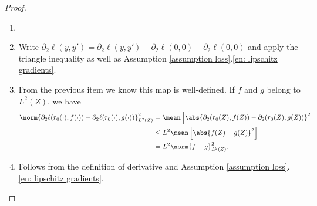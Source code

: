 \begin{proof}
    \begin{enumerate}
        \item[]
        \item Write $ \partial_{ 2 } \ell ( y, y' ) = \partial_{ 2 } \ell ( y, y' ) - \partial_{ 2 } \ell ( 0, 0 ) + \partial_{ 2 } \ell ( 0, 0 ) $ and apply the triangle inequality as well as Assumption \ref{assumption loss}.\ref{en: lipschitz gradients}.
        \item From the previous item we know this map is well-defined.
            If $ f $ and $ g $ belong to $ L^{ 2 } ( Z ) $, we have
            \begin{align*}
                \norm{ \partial_{ 2 } \ell ( r_{ 0 } ( \cdot ), f ( \cdot ) ) - \partial_{ 2 } \ell ( r_{ 0 } ( \cdot ), g ( \cdot ) ) }_{ L^2 ( Z ) }^2
                &= \mean \left[
                    \abs{ 
                        \partial_{ 2 } ( r_{ 0 } ( Z ), f ( Z ) )
                        - \partial_{ 2 } ( r_{ 0 } ( Z ), g ( Z ) )
                    }^2
                \right] \\
                &\leq L^2 \mean \left[
                    \abs{ f ( Z ) - g ( Z ) }^2
                \right] \\
                &= L^2 \norm{ f - g }_{ L^2 ( Z ) }^2
            .\end{align*}
        \item Follows from the definition of derivative and Assumption \ref{assumption loss}.\ref{en: lipschitz gradients}.
    \end{enumerate}
\end{proof}
